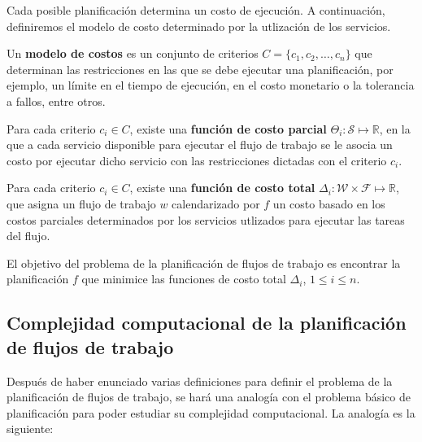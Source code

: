 Cada posible planificación determina un costo de ejecución. A continuación, definiremos el modelo de costo determinado por la utlización de los servicios.

\begin{defn}
Un \textbf{modelo de costos} es un conjunto de criterios $C = \{c_1, c_2, \dots, c_n\}$ que determinan las restricciones en las que se debe ejecutar una planificación, por ejemplo, un límite en el tiempo de ejecución, en el costo monetario o la tolerancia a fallos, entre otros.
\end{defn}

\begin{defn}
Para cada criterio $c_i \in C$, existe una \textbf{función de costo parcial} $\Theta_i : \mathcal{S} \mapsto \mathbb{R}$, en la que a cada servicio disponible para ejecutar el flujo de trabajo se le asocia un costo por ejecutar dicho servicio con las restricciones dictadas con el criterio $c_i$.
\end{defn}

\begin{defn}
Para cada criterio $c_i \in C$, existe una \textbf{función de costo total} $\Delta_i : \mathcal{W} \times \mathcal{F} \mapsto \mathbb{R}$, que asigna un flujo de trabajo $w$ calendarizado por $f$ un costo basado en los costos parciales determinados por los servicios utlizados para ejecutar las tareas del flujo.
\end{defn}

El objetivo del problema de la planificación de flujos de trabajo es encontrar la planificación $f$ que minimice las funciones de costo total $\Delta_i$, $1 \le i \le n$.

\subsection{Complejidad computacional de la planificación de flujos de trabajo}
Después de haber enunciado varias definiciones para definir el problema de la planificación de flujos de trabajo, se hará una analogía con el problema básico de planificación para poder estudiar su complejidad computacional. La analogía es la siguiente:


